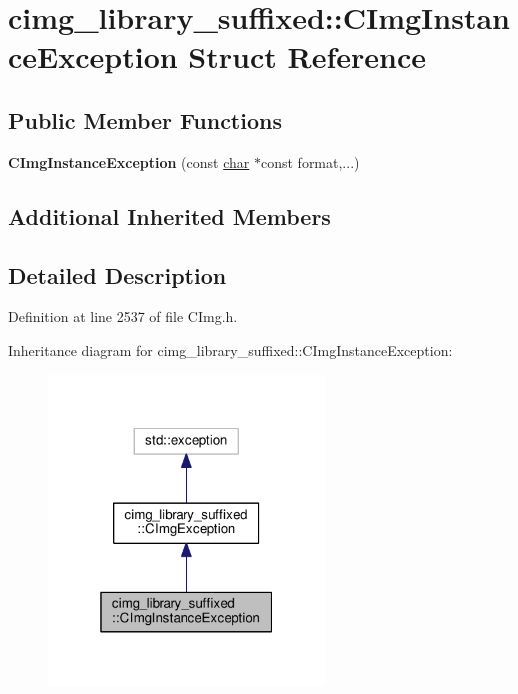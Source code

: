 \hypertarget{structcimg__library__suffixed_1_1CImgInstanceException}{}\section{cimg\+\_\+library\+\_\+suffixed\+:\+:C\+Img\+Instance\+Exception Struct Reference}
\label{structcimg__library__suffixed_1_1CImgInstanceException}
\subsection*{Public Member Functions}
\begin{DoxyCompactItemize}
\item 
\mbox{\label{structcimg__library__suffixed_1_1CImgInstanceException_a2fdde8bb00abef3ce8522891813a9669}} 
{\bfseries C\+Img\+Instance\+Exception} (const \hyperlink{classchar}{char} $\ast$const format,...)
\end{DoxyCompactItemize}
\subsection*{Additional Inherited Members}


\subsection{Detailed Description}


Definition at line 2537 of file C\+Img.\+h.



Inheritance diagram for cimg\+\_\+library\+\_\+suffixed\+:\+:C\+Img\+Instance\+Exception\+:
\nopagebreak
\begin{figure}[H]
\begin{center}
\leavevmode
\includegraphics[width=208pt]{d1/d97/structcimg__library__suffixed_1_1CImgInstanceException__inherit__graph}
\end{center}
\end{figure}


